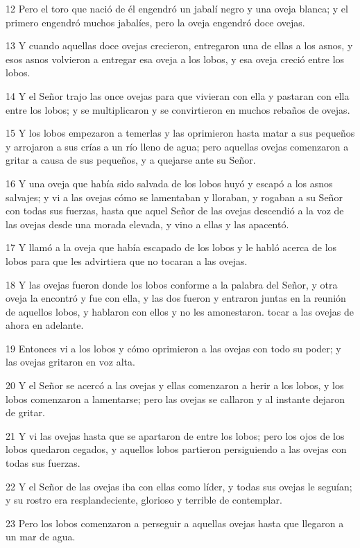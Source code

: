 \par 12 Pero el toro que nació de él engendró un jabalí negro y una oveja blanca; y el primero engendró muchos jabalíes, pero la oveja engendró doce ovejas.
\par 13 Y cuando aquellas doce ovejas crecieron, entregaron una de ellas a los asnos, y esos asnos volvieron a entregar esa oveja a los lobos, y esa oveja creció entre los lobos.
\par 14 Y el Señor trajo las once ovejas para que vivieran con ella y pastaran con ella entre los lobos; y se multiplicaron y se convirtieron en muchos rebaños de ovejas.
\par 15 Y los lobos empezaron a temerlas y las oprimieron hasta matar a sus pequeños y arrojaron a sus crías a un río lleno de agua; pero aquellas ovejas comenzaron a gritar a causa de sus pequeños, y a quejarse ante su Señor.
\par 16 Y una oveja que había sido salvada de los lobos huyó y escapó a los asnos salvajes; y vi a las ovejas cómo se lamentaban y lloraban, y rogaban a su Señor con todas sus fuerzas, hasta que aquel Señor de las ovejas descendió a la voz de las ovejas desde una morada elevada, y vino a ellas y las apacentó.
\par 17 Y llamó a la oveja que había escapado de los lobos y le habló acerca de los lobos para que les advirtiera que no tocaran a las ovejas.
\par 18 Y las ovejas fueron donde los lobos conforme a la palabra del Señor, y otra oveja la encontró y fue con ella, y las dos fueron y entraron juntas en la reunión de aquellos lobos, y hablaron con ellos y no les amonestaron. tocar a las ovejas de ahora en adelante.
\par 19 Entonces vi a los lobos y cómo oprimieron a las ovejas con todo su poder; y las ovejas gritaron en voz alta.
\par 20 Y el Señor se acercó a las ovejas y ellas comenzaron a herir a los lobos, y los lobos comenzaron a lamentarse; pero las ovejas se callaron y al instante dejaron de gritar.
\par 21 Y vi las ovejas hasta que se apartaron de entre los lobos; pero los ojos de los lobos quedaron cegados, y aquellos lobos partieron persiguiendo a las ovejas con todas sus fuerzas.
\par 22 Y el Señor de las ovejas iba con ellas como líder, y todas sus ovejas le seguían; y su rostro era resplandeciente, glorioso y terrible de contemplar.
\par 23 Pero los lobos comenzaron a perseguir a aquellas ovejas hasta que llegaron a un mar de agua.

